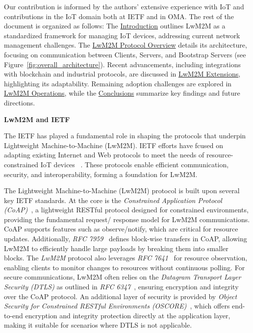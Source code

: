 \documentclass[11pt,sigconf]{iabart}
\begin{document}
Our contribution is informed by the authors' extensive experience with IoT and contributions in the IoT domain both at IETF and in OMA. The rest of the document is organized as follows: The \hyperref[introduction]{Introduction} outlines LwM2M as a standardized framework for managing IoT devices, addressing current network management challenges. The \hyperref[overview]{LwM2M Protocol Overview} details its architecture, focusing on communication between Clients, Servers, and Bootstrap Servers (see Figure~\ref{fig:overall_architecture}). Recent advancements, including integrations with blockchain and industrial protocols, are discussed in \hyperref[extensions]{LwM2M Extensions}, highlighting its adaptability. Remaining adoption challenges are explored in \hyperref[operations]{LwM2M Operations}, while the \hyperref[conclusions]{Conclusions} summarize key findings and future directions.

\textbf{LwM2M and IETF}

The IETF has played a fundamental role in shaping the protocols that underpin Lightweight Machine-to-Machine (LwM2M). IETF efforts have fcused on adapting existing Internet and Web protocols to meet the needs of resource-constrained IoT devices ~\cite{9139045}. These protocols enable efficient communication, security, and interoperability, forming a foundation for LwM2M.

The Lightweight Machine-to-Machine (LwM2M) protocol is built upon several key IETF standards. At the core is the \textit{Constrained Application Protocol (CoAP)}~\cite{rfc7252}, a lightweight RESTful protocol designed for constrained environments, providing the fundamental request/ response model for LwM2M communications. CoAP supports features such as observe/notify, which are critical for resource updates. Additionally, \textit{RFC 7959}~\cite{rfc7959} defines block-wise transfers in CoAP, allowing LwM2M to efficiently handle large payloads by breaking them into smaller blocks. The \textit{LwM2M} protocol also leverages \textit{RFC 7641}~\cite{rfc7641} for resource observation, enabling clients to monitor changes to resources without continuous polling. For secure communications, LwM2M often relies on the \textit{Datagram Transport Layer Security (DTLS)} as outlined in \textit{RFC 6347}~\cite{rfc6347}, ensuring encryption and integrity over the CoAP protocol. An additional layer of security is provided by \textit{Object Security for Constrained RESTful Environments (OSCORE)}~\cite{rfc8613}, which offers end-to-end encryption and integrity protection directly at the application layer, making it suitable for scenarios where DTLS is not applicable. 
\end{document}
